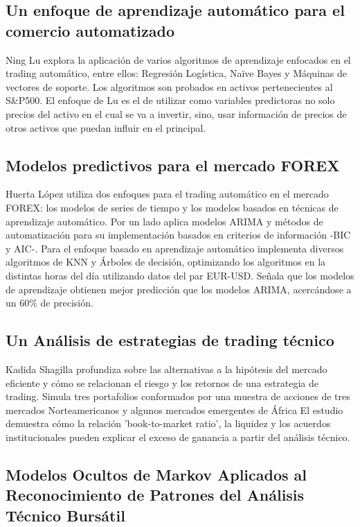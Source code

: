 \documentclass[a4paper,12pt]{Latex/Classes/PhDthesisPSnPDF}
\begin{document}
\subsection{Un enfoque de aprendizaje automático para el comercio automatizado}

Ning Lu explora la aplicación de varios algoritmos de aprendizaje enfocados en el trading automático, entre ellos: Regresión Logística, Naïve Bayes y Máquinas de vectores de soporte. Los algoritmos son probados en activos pertenecientes al S\&P500. El enfoque de Lu es el de utilizar como variables predictoras no solo precios del activo en el cual se va a invertir, sino, usar información de precios de otros activos que puedan influir en el principal.

\subsection{Modelos predictivos para el mercado FOREX}

Huerta López utiliza dos enfoques para el trading automático en el mercado FOREX: los modelos de series de tiempo y los modelos basados en técnicas de aprendizaje automático. Por un lado aplica modelos ARIMA y métodos de automatización para su implementación basados en criterios de información -BIC y AIC-. Para el enfoque basado en aprendizaje automático implementa diversos algoritmos de KNN y Árboles de decisión, optimizando los algoritmos en la distintas horas del día utilizando datos del par EUR-USD. Señala que los modelos de aprendizaje obtienen mejor predicción que los modelos ARIMA, acercándose a un 60\% de precisión.

\subsection{Un Análisis de estrategias de trading técnico}

Kadida Shagilla profundiza sobre las alternativas a la hipótesis del mercado eficiente y cómo se relacionan el riesgo y los retornos de una estrategia de trading. Simula tres portafolios conformados por una muestra de acciones de tres mercados Norteamericanos y algunos mercados emergentes de África El estudio demuestra cómo la relación 'book-to-market ratio', la liquidez y los acuerdos institucionales pueden explicar el exceso de ganancia a partir del análisis técnico. 

\subsection{Modelos Ocultos de Markov Aplicados al Reconocimiento de Patrones del Análisis Técnico Bursátil}
\end{document}
